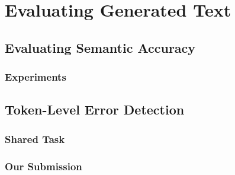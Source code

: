 
\chapter{Evaluating Generated Text}
\label{chap:evaluation}
\section{Evaluating Semantic Accuracy}
\label{sec:sem-acc}
\subsection{Experiments}
\label{sec:sem-acc-exp}
\section{Token-Level Error Detection}
\label{sec:eval-token}
\subsection{Shared Task}
\label{sec:eval-st}
\subsection{Our Submission}
\label{sec:eval-ours}